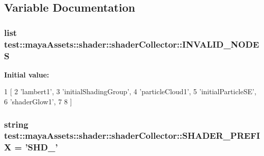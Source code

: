 \subsection{\-Variable \-Documentation}
\hypertarget{namespacetest_1_1mayaAssets_1_1shader_1_1shaderCollector_a9f738a3e2a710b17ec46d6a0351fdc4e}{
\subsubsection[{\-I\-N\-V\-A\-L\-I\-D\-\_\-\-N\-O\-D\-E\-S}]{\setlength{\rightskip}{0pt plus 5cm}list {\bf test\-::maya\-Assets\-::shader\-::shader\-Collector\-::\-I\-N\-V\-A\-L\-I\-D\-\_\-\-N\-O\-D\-E\-S}}}\label{db/de4/namespacetest_1_1mayaAssets_1_1shader_1_1shaderCollector_a9f738a3e2a710b17ec46d6a0351fdc4e}
{\bfseries \-Initial value\-:}
\begin{DoxyCode}
1 [
2     'lambert1',
3     'initialShadingGroup',
4     'particleCloud1',
5     'initialParticleSE',
6     'shaderGlow1',
7 
8 ]
\end{DoxyCode}
\hypertarget{namespacetest_1_1mayaAssets_1_1shader_1_1shaderCollector_a551a9daab0822b196b7d89edadbfdc5b}{
\subsubsection[{\-S\-H\-A\-D\-E\-R\-\_\-\-P\-R\-E\-F\-I\-X}]{\setlength{\rightskip}{0pt plus 5cm}string {\bf test\-::maya\-Assets\-::shader\-::shader\-Collector\-::\-S\-H\-A\-D\-E\-R\-\_\-\-P\-R\-E\-F\-I\-X} = '\-S\-H\-D\-\_\-'}}\label{db/de4/namespacetest_1_1mayaAssets_1_1shader_1_1shaderCollector_a551a9daab0822b196b7d89edadbfdc5b}
